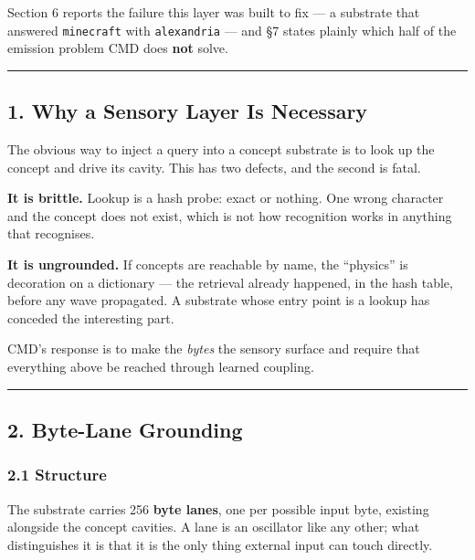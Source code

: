\documentclass[
  11pt,
  a4paper,
]{article}
\begin{document}
Section 6 reports the failure this layer was built to fix --- a
substrate that answered \texttt{minecraft} with \texttt{alexandria} ---
and §7 states plainly which half of the emission problem CMD does
\textbf{not} solve.

\begin{center}\rule{0.5\linewidth}{0.5pt}\end{center}

\subsection{1. Why a Sensory Layer Is
Necessary}\label{why-a-sensory-layer-is-necessary}

The obvious way to inject a query into a concept substrate is to look up
the concept and drive its cavity. This has two defects, and the second
is fatal.

\textbf{It is brittle.} Lookup is a hash probe: exact or nothing. One
wrong character and the concept does not exist, which is not how
recognition works in anything that recognises.

\textbf{It is ungrounded.} If concepts are reachable by name, the
``physics'' is decoration on a dictionary --- the retrieval already
happened, in the hash table, before any wave propagated. A substrate
whose entry point is a lookup has conceded the interesting part.

CMD's response is to make the \emph{bytes} the sensory surface and
require that everything above be reached through learned coupling.

\begin{center}\rule{0.5\linewidth}{0.5pt}\end{center}

\subsection{2. Byte-Lane Grounding}\label{byte-lane-grounding}

\subsubsection{2.1 Structure}\label{structure}

The substrate carries 256 \textbf{byte lanes}, one per possible input
byte, existing alongside the concept cavities. A lane is an oscillator
like any other; what distinguishes it is that it is the only thing
external input can touch directly.
\end{document}
